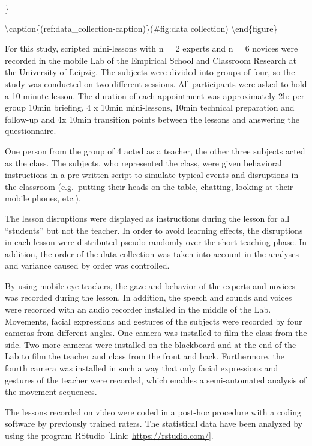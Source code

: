 \documentclass[
  english,
  man,floatsintext]{apa6}
\begin{document}
\}

\textbackslash caption\{(ref:data\_collection-caption)\}(\#fig:data collection)
\textbackslash end\{figure\}

For this study, scripted mini-lessons with n = 2 experts and n = 6 novices were recorded in the mobile Lab of the Empirical School and Classroom Research at the University of Leipzig. The subjects were divided into groups of four, so the study was conducted on two different sessions. All participants were asked to hold a 10-minute lesson. The duration of each appointment was approximately 2h: per group 10min briefing, 4 x 10min mini-lessons, 10min technical preparation and follow-up and 4x 10min transition points between the lessons and answering the questionnaire.

One person from the group of 4 acted as a teacher, the other three subjects acted as the class. The subjects, who represented the class, were given behavioral instructions in a pre-written script to simulate typical events and disruptions in the classroom (e.g.~putting their heads on the table, chatting, looking at their mobile phones, etc.).

The lesson disruptions were displayed as instructions during the lesson for all ``students'' but not the teacher. In order to avoid learning effects, the disruptions in each lesson were distributed pseudo-randomly over the short teaching phase. In addition, the order of the data collection was taken into account in the analyses and variance caused by order was controlled.

By using mobile eye-trackers, the gaze and behavior of the experts and novices was recorded during the lesson. In addition, the speech and sounds and voices were recorded with an audio recorder installed in the middle of the Lab. Movements, facial expressions and gestures of the subjects were recorded by four cameras from different angles. One camera was installed to film the class from the side. Two more cameras were installed on the blackboard and at the end of the Lab to film the teacher and class from the front and back. Furthermore, the fourth camera was installed in such a way that only facial expressions and gestures of the teacher were recorded, which enables a semi-automated analysis of the movement sequences.

The lessons recorded on video were coded in a post-hoc procedure with a coding software by previously trained raters. The statistical data have been analyzed by using the program RStudio {[}Link: \url{https://rstudio.com/}{]}.
\end{document}
